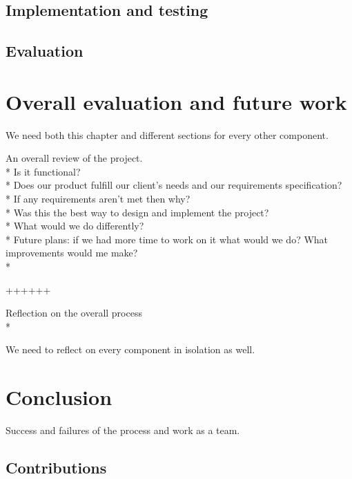 \documentclass{l3proj}
\begin{document}
\section{Implementation and testing}


\section{Evaluation}


\chapter{Overall evaluation and future work}

We need both this chapter and different sections for every other component.



An overall review of the project. \\*
Is it functional? \\*
Does our product fulfill our client’s needs and our requirements specification?\\*
If any requirements aren’t met then why? \\*
Was this the best way to design and implement the project?\\*
What would we do differently? \\*
Future plans: if we had more time to work on it what would we do? What improvements would me make?\\*

++++++

Reflection on the overall process \\*

We need to reflect on every component in isolation as well.


\chapter{Conclusion}

Success and failures of the process and work as a team.

\section{Contributions}
\end{document}
